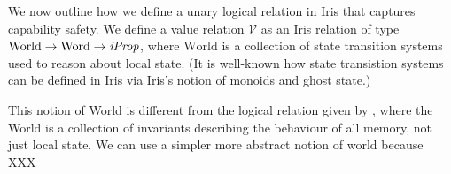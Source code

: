 \documentclass[sigplan,review]{acmart}\settopmatter{printfolios=true,printccs=false,printacmref=false}
\newcommand{\bigsep}{\mathop{\scalebox{2.5}{\raisebox{-0.4ex}{$*$}}}}%
\newcommand{\interp}[2]{(#1)(#2)}
\begin{document}
	



\newcommand{\World}{\mathrm{World}} \newcommand{\Word}{\mathrm{Word}} We now outline how we define a unary logical relation in Iris that captures capability safety.
We define a value relation $\mathcal{V}$ as an Iris relation of type $\World \to \Word \to \emph{iProp}$, where $\World$ is a collection of state transition systems used to reason about local state.
(It is well-known how state transistion systems can be defined in Iris via Iris's notion of monoids and ghost state.)

This notion of World is different from the logical relation given by \cite{skorstengaardESOP18}, where the World is a collection of invariants describing the behaviour of all memory, not just local state.
We can use a simpler more abstract notion of world because XXX
\end{document}
